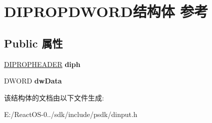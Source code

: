 \hypertarget{struct_d_i_p_r_o_p_d_w_o_r_d}{}\section{D\+I\+P\+R\+O\+P\+D\+W\+O\+R\+D结构体 参考}
\label{struct_d_i_p_r_o_p_d_w_o_r_d}
\subsection*{Public 属性}
\begin{DoxyCompactItemize}
\item 
\mbox{\label{struct_d_i_p_r_o_p_d_w_o_r_d_a18a73c7b6d45204f1d92ddcb2dc5db4a}} 
\hyperlink{struct_d_i_p_r_o_p_h_e_a_d_e_r}{D\+I\+P\+R\+O\+P\+H\+E\+A\+D\+ER} {\bfseries diph}
\item 
\mbox{\label{struct_d_i_p_r_o_p_d_w_o_r_d_ae5fee0e4c685d2326c7f63b3707874a9}} 
D\+W\+O\+RD {\bfseries dw\+Data}
\end{DoxyCompactItemize}


该结构体的文档由以下文件生成\+:\begin{DoxyCompactItemize}
\item 
E\+:/\+React\+O\+S-\/0../sdk/include/psdk/dinput.\+h\end{DoxyCompactItemize}
